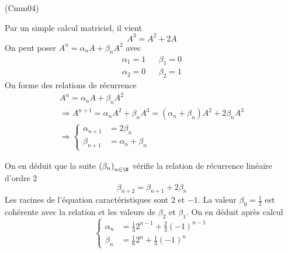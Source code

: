 \begin{tiny}(Cmm04)\end{tiny} Par un simple calcul matriciel, il vient
\begin{displaymath}
 A^3 = A^2 + 2A
\end{displaymath}
On peut poser $A^n=\alpha_n A + \beta_n A^2$ avec
\[
\begin{aligned}
 \alpha_1 = 1& & \beta_1=0\\ \alpha_2 = 0& & \beta_2=1 
\end{aligned}
\]
On forme des relations de récurrence
\begin{multline*}
 A^n=\alpha_n A + \beta_n A^2\\ \Rightarrow
 A^{n+1}=\alpha_n A^2 + \beta_n A^3
= (\alpha_n +\beta_n)A^2 +2\beta_n A^3\\
\Rightarrow
\left\lbrace 
\begin{aligned}
\alpha_{n+1}&= 2\beta_n\\\beta_{n+1}&=\alpha_n + \beta_n 
\end{aligned}
\right. 
\end{multline*}

On en déduit que la suite $\left( \beta_n\right) _{n\in \N}$ vérifie la relation de récurrence linéaire d'ordre 2
\begin{displaymath}
 \beta_{n+2} = \beta_{n+1} + 2\beta_n
\end{displaymath}
Les racines de l'équation caractéristiques sont $2$ et $-1$. La valeur $\beta_0=\frac{1}{2}$ est cohérente avec la relation et les valeurs de $\beta_2$ et $\beta_1$. On en déduit après calcul 
\begin{displaymath}
 \left\lbrace 
\begin{aligned}
 \alpha_n &= \frac{1}{3}2^{n-1} + \frac{2}{3}(-1)^{n-1}\\
 \beta_n &= \frac{1}{6}2^n + \frac{1}{3}(-1)^n
\end{aligned}
\right. 
\end{displaymath}

